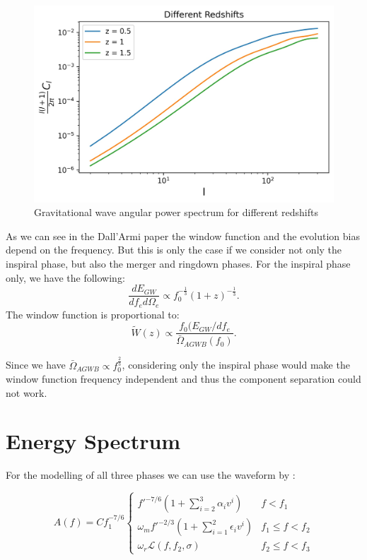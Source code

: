 \begin{figure}[h]
 \centering
 \includegraphics[width=0.7\linewidth]{Images/GW_autocorr_z.jpg}
 \caption{Gravitational wave angular power spectrum for different redshifts}
 \label{plot_Cl_redshift}
\end{figure} 

As we can see in the Dall'Armi paper the window function and the evolution bias 
depend on the frequency. But this is only the case if we consider not only the
 inspiral phase, but also the merger and ringdown phases. For the inspiral phase
  only, we have the following:
\begin{equation}
    \frac{dE_{GW}}{df_e d\Omega_e} \propto f_0^{-\frac{1}{3}}(1+z)^{-\frac{1}{3}} .
\end{equation}
The window function is proportional to:
\begin{equation}
    \tilde{W}(z)\propto \frac{f_0(E_{GW}/df_e}{\bar{\Omega}_{AGWB}(f_0)} .
\end{equation}

Since we have $\bar{\Omega}_{AGWB}\propto f_0^{\frac{2}{3}}$, considering only 
the inspiral phase would make the window function frequency independent and thus the 
component separation could not work. 


\section{Energy Spectrum}


For the modelling of all three phases we can 
use the waveform by \cite{ajith_inspiral-merger-ringdown_2011}:

\[ A(f) = C f_1^{-7/6} \begin{cases}
        f'^{-7/6}(1+ \sum_{i=2}^3\alpha_i v^i) & f<f_1 \\
        \omega_m f'^{-2/3}(1+ \sum_{i=1}^2 \epsilon_i v^i) & f_1 \leq f < f_2 \\
        \omega_r \mathcal{L}(f, f_2, \sigma) & f_2 \leq f < f_3
\end{cases}
\]

